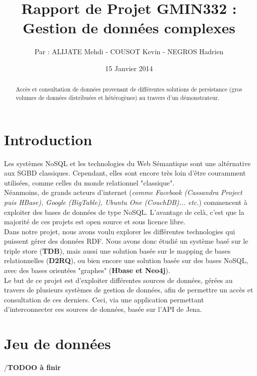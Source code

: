 \documentclass{article}
\title{Rapport de Projet GMIN332 :\\ Gestion de données complexes}
\author{Par : ALIJATE Mehdi - COUSOT Kevin - NEGROS Hadrien}
\date{15 Janvier 2014}
\begin{document}
\maketitle
\tableofcontents

\begin{abstract}
Accès et consultation de données provenant de différentes solutions de persistance (gros volumes de données distribuées et hétérogènes) au travers d'un démonstrateur.
\end{abstract}








\newpage 
\section{Introduction}\label{sec:intro}
Les systèmes NoSQL et les technologies du Web Sémantique sont une altérnative aux SGBD classiques. Cependant, elles sont encore très loin d'être couramment utilisées, comme celles du monde relationnel "classique". \\
Néanmoins, de grands acteurs d'internet (\textit{comme Facebook (Cassandra Project puis HBase), Google (BigTable), Ubuntu One (CouchDB)... etc.}) commencent à exploiter des bases de données de type NoSQL. L'avantage de celà, c'est que la majorité de ces projets est open source et sous licence libre.
\\
Dans notre projet, nous avons voulu explorer les différentes technologies qui puissent gérer des données RDF. Nous avons donc étudié un système basé sur le triple store (\textbf{TDB}), mais aussi une solution basée sur le mapping de bases relationnelles (\textbf{D2RQ}), ou bien encore une solution basée sur des bases NoSQL, avec des bases orientées "graphes" (\textbf{Hbase et Neo4j}).
\\
Le but de ce projet est d’exploiter différentes sources de données, gérées au travers de plusieurs systèmes de gestion de données, afin de permettre un accès et consultation de ces derniers. Ceci, via une application permettant d'interconnecter ces sources de données, basée sur l'API de Jena.






\section{Jeu de données}
/\textbf{TODOO à finir}\\
\end{document}
